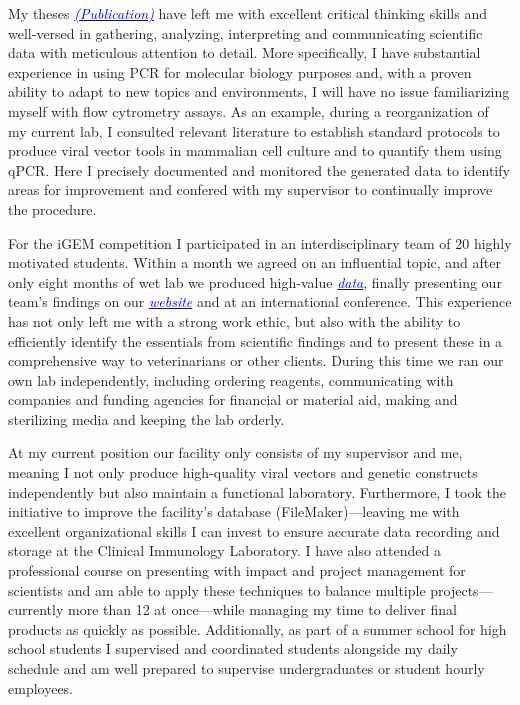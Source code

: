 \documentclass[11pt,a4paper,sans]{moderncv}
\begin{document}
\begin{spacing}{1.1}
My theses {\href{https://www.ncbi.nlm.nih.gov/pubmed/29517395}{\textcolor{blue}{{\textit{(Publication)}}}}} have left me with excellent critical thinking skills and well-versed in gathering, analyzing, interpreting and communicating scientific data with meticulous attention to detail. 
More specifically, I have substantial experience in using PCR for molecular biology purposes and, with a proven ability to adapt to new topics and environments, I will have no issue familiarizing myself with flow cytrometry assays. 
As an example, during a reorganization of my current lab, I consulted relevant literature to establish standard protocols to produce viral vector tools in mammalian cell culture and to quantify them using qPCR. 
Here I precisely documented and monitored the generated data to identify areas for improvement and confered with my supervisor to continually improve the procedure. \par%
For the iGEM competition I participated in an interdisciplinary team of 20 highly motivated students. 
Within a month we agreed on an influential topic, and after only eight months of wet lab we produced high-value  {\href{https://www.ncbi.nlm.nih.gov/pubmed/29803867}{\textcolor{blue}{\textit{data}}}}, finally presenting our team's findings on our {\href{http://2015.igem.org/Team:Freiburg}{\textcolor{blue}{\textit{website}}}} and at an international conference. 
This experience has not only left me with a strong work ethic, but also with the ability to efficiently identify the essentials from scientific findings and to present these in a comprehensive way to veterinarians or other clients. 
During this time we ran our own lab independently, including ordering reagents, communicating with companies and funding agencies for financial or material aid, making and sterilizing media and keeping the lab orderly. \par 
At my current position our facility only consists of my supervisor and me, meaning I not only produce high-quality viral vectors and genetic constructs independently but also maintain a functional laboratory. 
Furthermore, I took the initiative to improve the facility's database (FileMaker)---leaving me with excellent organizational skills I can invest to ensure accurate data recording and storage at the Clinical Immunology Laboratory. 
I have also attended a professional course on presenting with impact and project management for scientists and am able to apply these techniques to balance multiple projects---currently more than 12 at once---while managing my time to deliver final products as quickly as possible. 
Additionally, as part of a summer school for high school students I supervised and coordinated students alongside my daily schedule and am well prepared to supervise undergraduates or student hourly employees. \par%



\end{spacing}
\end{document}
